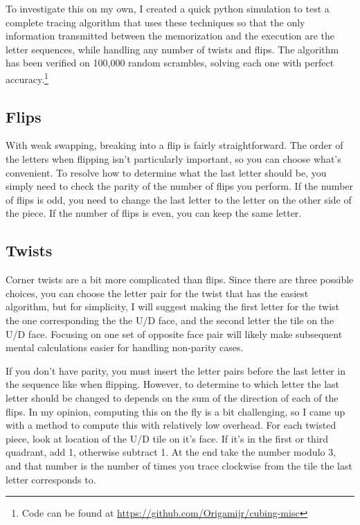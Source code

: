 \documentclass{article}
\begin{document}
To investigate this on my own, I created a quick python simulation to test a complete tracing algorithm that uses these techniques so that the only information transmitted between the memorization and the execution are the letter sequences, while handling any number of twists and flips. The algorithm has been verified on 100,000 random scrambles, solving each one with perfect accuracy.\footnote{Code can be found at \url{https://github.com/Origamijr/cubing-misc}}

\subsection{Flips}

With weak swapping, breaking into a flip is fairly straightforward. The order of the letters when flipping isn't particularly important, so you can choose what's convenient. To resolve how to determine what the last letter should be, you simply need to check the parity of the number of flips you perform. If the number of flips is odd, you need to change the last letter to the letter on the other side of the piece. If the number of flips is even, you can keep the same letter.

\subsection{Twists}

Corner twists are a bit more complicated than flips. Since there are three possible choices, you can choose the letter pair for the twist that has the easiest algorithm, but for simplicity, I will suggest making the first letter for the twist the one corresponding the the U/D face, and the second letter the tile on the U/D face. Focusing on one set of opposite face pair will likely make subsequent mental calculations easier for handling non-parity cases.

If you don't have parity, you must insert the letter pairs before the last letter in the sequence like when flipping. However, to determine to which letter the last letter should be changed to depends on the sum of the direction of each of the flips. In my opinion, computing this on the fly is a bit challenging, so I came up with a method to compute this with relatively low overhead. For each twisted piece, look at location of the U/D tile on it's face. If it's in the first or third quadrant, add 1, otherwise subtract 1. At the end take the number modulo 3, and that number is the number of times you trace clockwise from the tile the last letter corresponds to.
\end{document}
